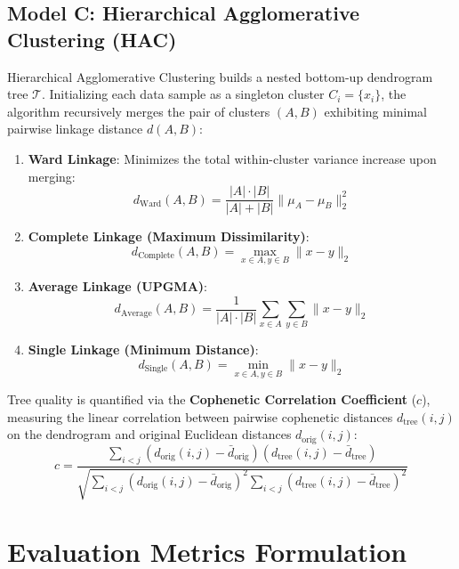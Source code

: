 \documentclass[12pt,a4paper]{article}
\begin{document}
\subsection{Model C: Hierarchical Agglomerative Clustering (HAC)}
Hierarchical Agglomerative Clustering builds a nested bottom-up dendrogram tree $\mathcal{T}$. Initializing each data sample as a singleton cluster $C_i = \{x_i\}$, the algorithm recursively merges the pair of clusters $(A, B)$ exhibiting minimal pairwise linkage distance $d(A, B)$:
\begin{enumerate}
\item \textbf{Ward Linkage}: Minimizes the total within-cluster variance increase upon merging:
\begin{equation}
d_{\text{Ward}}(A, B) = \frac{|A| \cdot |B|}{|A| + |B|} \| \mu_A - \mu_B \|_2^2
\end{equation}
\item \textbf{Complete Linkage (Maximum Dissimilarity)}:
\begin{equation}
d_{\text{Complete}}(A, B) = \max_{x \in A, y \in B} \| x - y \|_2
\end{equation}
\item \textbf{Average Linkage (UPGMA)}:
\begin{equation}
d_{\text{Average}}(A, B) = \frac{1}{|A| \cdot |B|} \sum_{x \in A} \sum_{y \in B} \| x - y \|_2
\end{equation}
\item \textbf{Single Linkage (Minimum Distance)}:
\begin{equation}
d_{\text{Single}}(A, B) = \min_{x \in A, y \in B} \| x - y \|_2
\end{equation}
\end{enumerate}

Tree quality is quantified via the \textbf{Cophenetic Correlation Coefficient} ($c$), measuring the linear correlation between pairwise cophenetic distances $d_{\text{tree}}(i, j)$ on the dendrogram and original Euclidean distances $d_{\text{orig}}(i, j)$:
\begin{equation}
c = \frac{\sum_{i < j} (d_{\text{orig}}(i, j) - \bar{d}_{\text{orig}})(d_{\text{tree}}(i, j) - \bar{d}_{\text{tree}})}{\sqrt{\sum_{i < j} (d_{\text{orig}}(i, j) - \bar{d}_{\text{orig}})^2 \sum_{i < j} (d_{\text{tree}}(i, j) - \bar{d}_{\text{tree}})^2}}
\end{equation}

\section{Evaluation Metrics Formulation}
\end{document}
